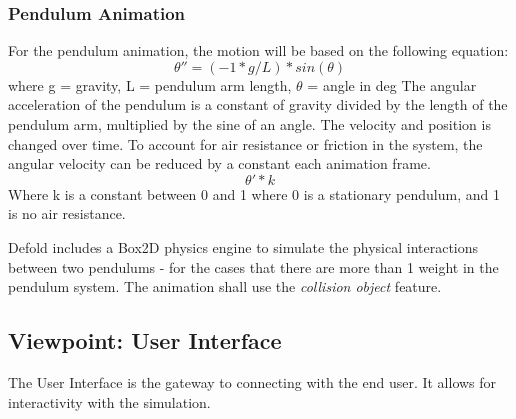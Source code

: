 \documentclass[onecolumn, draftclsnofoot,10pt, compsoc]{IEEEtran}
\begin{document}
\subsubsection{Pendulum Animation}
For the pendulum animation, the motion will be based on the following equation:
\begin{equation}
    \theta'' = (-1 * g/L)*sin(\theta)
\end{equation}
 where g = gravity, L = pendulum arm length, $\theta$ = angle in deg \newline
The angular acceleration of the pendulum is a constant of gravity divided by the length of the pendulum arm, multiplied by the sine of an angle. The velocity and position is changed over time.
To account for air resistance or friction in the system, the angular velocity can be reduced by a constant each animation frame. 
\begin{equation}
   \theta' * k
\end{equation}
Where k is a constant between 0 and 1 where 0 is a stationary pendulum, and 1 is no air resistance. 

Defold includes a Box2D physics engine to simulate the physical interactions between two pendulums - for the cases that there are more than 1 weight in the pendulum system. The animation shall use the \textit{collision object} feature. 





\subsection{Viewpoint: User Interface}
The User Interface is the gateway to connecting with the end user. It allows for interactivity with the simulation.
\end{document}
